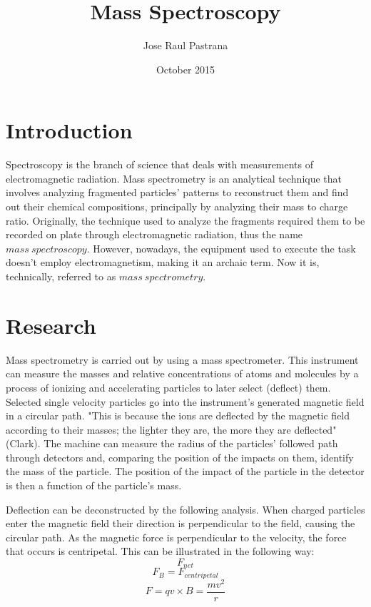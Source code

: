 \documentclass{article}
\title{Mass Spectroscopy}
\author{Jose Raul Pastrana }
\date{October 2015}
\begin{document}
\maketitle

\section{Introduction}

Spectroscopy is the branch of science that deals with measurements of electromagnetic radiation. Mass spectrometry is an analytical technique that involves analyzing fragmented particles' patterns to reconstruct them and find out their chemical compositions, principally by analyzing their mass to charge ratio. Originally, the technique used to analyze the fragments required them to be recorded on plate through electromagnetic radiation, thus the name $mass \ spectroscopy$. However, nowadays, the equipment used to execute the task doesn't employ electromagnetism, making it an archaic term. Now it is, technically, referred to as $mass \ spectrometry$.

\section{Research}

Mass spectrometry is carried out by using a mass spectrometer. This instrument can measure the masses and relative concentrations of atoms and molecules by a process of ionizing and accelerating particles to later select (deflect) them. Selected single velocity particles go into the instrument's generated magnetic field in a circular path. "This is because the ions are deflected by the magnetic field according to their masses; the lighter they are, the more they are deflected" (Clark). The machine can measure the radius of the particles' followed path through detectors and, comparing the position of the impacts on them, identify the mass of the particle. The position of the impact of the particle in the detector is then a function of the particle's mass. 

Deflection can be deconstructed by the following analysis. When charged particles enter the magnetic field their direction is perpendicular to the field, causing the circular path. As the magnetic force is perpendicular to the velocity, the force that occurs is centripetal. This can be illustrated in the following way:
$$F_{net}$$
$$F_{B} = F_{centripetal}$$
$$F = qv \times B = \frac{mv^2}{r}$$
\end{document}
